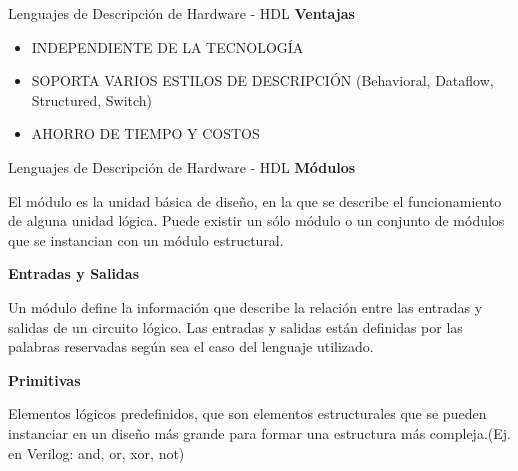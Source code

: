 \documentclass[11pt]{beamer}
\begin{document}
\begin{frame}{Lenguajes de Descripción de Hardware - HDL}
	\textbf{Ventajas} \newline
	
	\begin{itemize}
		\item INDEPENDIENTE DE LA TECNOLOGÍA\newline
		\item SOPORTA VARIOS ESTILOS DE DESCRIPCIÓN (Behavioral, Dataflow, Structured, Switch)\newline
		\item AHORRO DE TIEMPO Y COSTOS\newline
	\end{itemize}
	
	
\end{frame}

\begin{frame}{Lenguajes de Descripción de Hardware - HDL}
	\textbf{Módulos} 
	
	El módulo es la unidad básica de diseño, en la que se describe el funcionamiento de alguna unidad lógica. Puede existir un sólo módulo o un conjunto de módulos que se instancian con un módulo estructural.\newline
	
	
	\textbf{Entradas y Salidas} 
	
	Un módulo define la información que describe la relación entre las entradas y salidas de un circuito lógico. Las entradas y salidas están definidas por las palabras reservadas según sea el caso del lenguaje utilizado.\newline
	
	\textbf{Primitivas} 
	
	Elementos lógicos predefinidos, que son elementos estructurales que se pueden instanciar en un diseño más grande para formar una estructura más compleja.(Ej. en Verilog: and, or, xor, not)
	
	
	
\end{frame}

	
\end{document}
